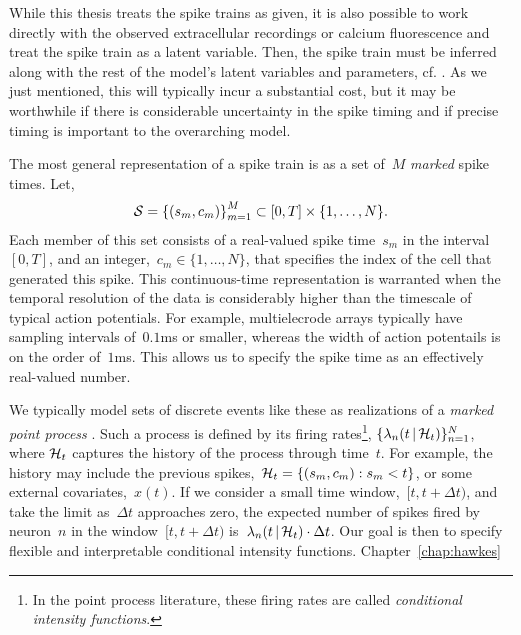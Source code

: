 While this thesis treats the spike trains as given, it is also possible to
work directly with the observed extracellular recordings or calcium
fluorescence and treat the spike train as a latent variable.  Then,
the spike train must be inferred along with the rest of the model's
latent variables and parameters, cf. \cite{pillow2013model}. As we just 
mentioned, this will typically incur a substantial cost, but it may be 
worthwhile if there is considerable uncertainty in the spike timing 
and if precise timing is important to the overarching model.

The most general representation of a spike train is as a set of~$M$
\emph{marked} spike times.
Let,
\begin{align}
  \mathcal{S} = \left \{ (s_m, c_m) \right \}_{m=1}^M \subset [0, T] \times \{1, \ldots, N\}.
\end{align}
Each member of this set consists of a real-valued spike time~$s_m$ in
the interval~$[0, T]$, and an integer,~$c_m \in \{1, \ldots, N\}$,
that specifies the index of the cell that generated this spike. 
This continuous-time representation is
warranted when the temporal resolution of the data is considerably
higher than the timescale of typical action potentials. For example,
multielecrode arrays typically have sampling intervals of~$0.1$ms or
smaller, whereas the width of action potentails is on the order
of~$1$ms. This allows us to specify the spike time as an effectively
real-valued number.  

We typically model sets of discrete events like these as realizations
of a \emph{marked point process} \cite{daley2003introduction1}. Such a
process is defined by its firing rates\footnote{In the point process
  literature, these firing rates are called \emph{conditional
    intensity functions}.},
${\{\lambda_n(t \,|\, \mathcal{H}_t)\}_{n=1}^N}$, where $\mathcal{H}_t$ captures
the history of the process through time~$t$. For example, the history
may include the previous spikes,~${\mathcal{H}_t = \{(s_m, c_m): s_m < t\}}$,
or some external covariates,~$x(t)$.  If we consider a small time
window,~${[t, t+\Delta t)}$, and take the limit as~$\Delta t$
approaches zero, the expected number of spikes fired by neuron~$n$ in
the window~${[t, t+\Delta t)}$
is~${\lambda_n(t \,|\, \mathcal{H}_t) \cdot \Delta t}$. Our
goal is then to specify flexible and interpretable conditional intensity
functions. Chapter~\ref{chap:hawkes} 

